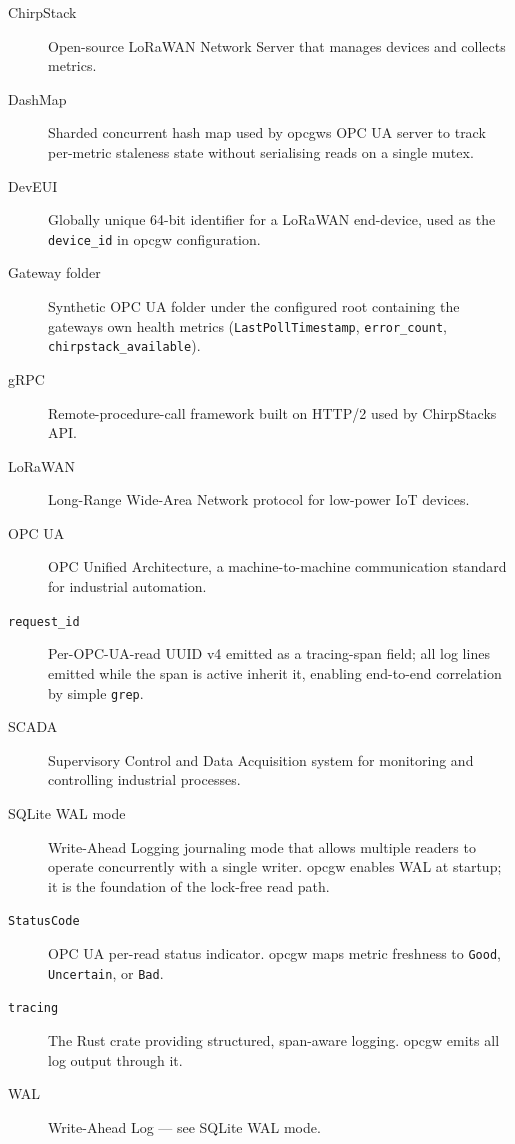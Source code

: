 \begin{description}
\item[ChirpStack]
Open-source LoRaWAN Network Server that manages devices and collects metrics.
\item[DashMap]
Sharded concurrent hash map used by opcgw\textquotesingle s OPC UA server to track per-metric staleness state without serialising reads on a single mutex.
\item[DevEUI]
Globally unique 64-bit identifier for a LoRaWAN end-device, used as the \texttt{device\_id} in opcgw configuration.
\item[Gateway folder]
Synthetic OPC UA folder under the configured root containing the gateway\textquotesingle s own health metrics (\texttt{LastPollTimestamp}, \texttt{error\_count}, \texttt{chirpstack\_available}).
\item[gRPC]
Remote-procedure-call framework built on HTTP/2 used by ChirpStack\textquotesingle s API.
\item[LoRaWAN]
Long-Range Wide-Area Network protocol for low-power IoT devices.
\item[OPC UA]
OPC Unified Architecture, a machine-to-machine communication standard for industrial automation.
\item[\texttt{request\_id}]
Per-OPC-UA-read UUID v4 emitted as a tracing-span field; all log lines emitted while the span is active inherit it, enabling end-to-end correlation by simple \texttt{grep}.
\item[SCADA]
Supervisory Control and Data Acquisition system for monitoring and controlling industrial processes.
\item[SQLite WAL mode]
Write-Ahead Logging journaling mode that allows multiple readers to operate concurrently with a single writer. opcgw enables WAL at startup; it is the foundation of the lock-free read path.
\item[\texttt{StatusCode}]
OPC UA per-read status indicator. opcgw maps metric freshness to \texttt{Good}, \texttt{Uncertain}, or \texttt{Bad}.
\item[\texttt{tracing}]
The Rust crate providing structured, span-aware logging. opcgw emits all log output through it.
\item[WAL]
Write-Ahead Log --- see SQLite WAL mode.
\end{description}
